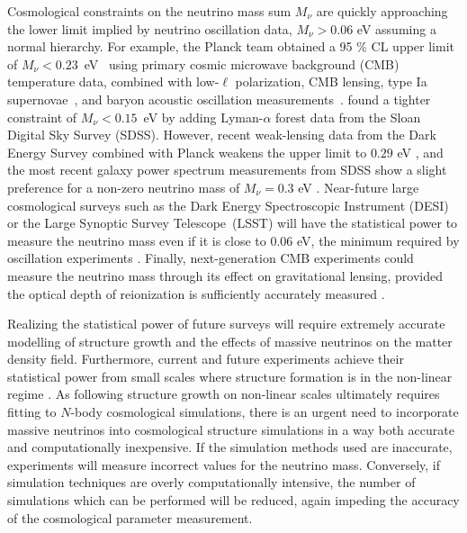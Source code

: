 \documentclass[useAMS, usenatbib]{mnras}
\begin{document}
Cosmological constraints on the neutrino mass sum $M_\nu$ are quickly approaching the lower limit implied by neutrino oscillation data, $M_\nu > 0.06$ eV assuming a normal hierarchy. For example, the Planck team obtained a 95 \% CL upper limit of $M_\nu<0.23$~eV~\citep{planck2015xiii} using primary cosmic microwave background (CMB) temperature data, combined with low-$\ell$ polarization, CMB lensing, type Ia supernovae~\citep{Betoule_2014}, and baryon acoustic oscillation
measurements~\citep{Beutler_2011, Anderson_2014, Ross_2015}. \cite{Palanque_2015} found a tighter constraint of $M_\nu<0.15$~eV by adding Lyman-$\alpha$ forest data from the Sloan Digital Sky Survey (SDSS). However, recent weak-lensing data from the Dark Energy Survey combined with Planck weakens the upper limit to $0.29$ eV \citep{DES_2017}, and the most recent galaxy power spectrum measurements from SDSS show a slight preference for a non-zero neutrino mass of $M_\nu = 0.3$ eV \citep{Beutler_2014}.
Near-future large cosmological surveys such as the Dark Energy Spectroscopic Instrument (DESI) \citep{DESI} or the
Large Synoptic Survey Telescope~(LSST) \citep{LSST, Joudaki_2012} will have the statistical power to measure the neutrino mass even if it is close to $0.06$ eV, the minimum required by oscillation experiments \citep{Abazajian_2015}. Finally, next-generation CMB experiments could measure the neutrino mass through its effect on gravitational lensing, provided the optical depth of reionization is sufficiently accurately measured \citep{Abazajian_16}.

Realizing the statistical power of future surveys will require extremely accurate modelling of structure growth and the effects of massive neutrinos on the matter density field.
Furthermore, current and future experiments achieve their statistical power from small scales where structure formation is in the non-linear regime \citep[e.g.~][]{Troxel_2017, HSC_2017}.
As following structure growth on non-linear scales ultimately requires fitting to $N$-body cosmological simulations, there is an urgent need to incorporate massive neutrinos into cosmological structure simulations
in a way both accurate and computationally inexpensive.
If the simulation methods used are inaccurate, experiments will measure incorrect values for the neutrino mass.
Conversely, if simulation techniques are overly computationally intensive, the number of simulations which can be performed will be reduced, again impeding the accuracy of the cosmological parameter measurement.
\end{document}

